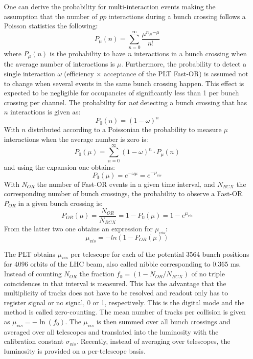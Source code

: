 One can derive the probability for multi-interaction events making the assumption that
the number of $pp$ interactions during a bunch crossing follows a Poisson statistics the following:
\begin{equation}
P_{\mu}(n) = \sum_{n=0}^{\infty} \frac{\mu^n e^{-\mu}}{n!}
\end{equation}
where $P_\mu(n)$ is the probability to have $n$ interactions in a bunch crossing when the average
number of interactions is $\mu$. Furthermore, the probability to detect a single interaction $\omega$
(efficiency $\times$ acceptance of the PLT Fast-OR) is assumed not to change when several events in the same
bunch crossing happen. This effect is expected to be negligible for occupancies of significantly less than 1 per
bunch crossing per channel. The probability for {\em not} detecting a bunch crossing
that has $n$ interactions is given as:
\begin{equation}
P_0(n) = (1 - \omega)^n
\end{equation}
With $n$ distributed according to a Poissonian the probability to measure $\mu$ interactions
when the average number is zero is:
\begin{equation}
P_0(\mu) = \sum_{n=0}^{\infty} (1 - \omega)^n \cdot P_{\mu}(n)
\end{equation}
and using the expansion one obtains:
\begin{equation}
P_0(\mu) = e^{-\omega \mu} = e^{-\mu_{vis}}
\end{equation}
With $N_{OR}$ the number of Fast-OR events in a given time interval, and $N_{BCX}$ the
corresponding number of bunch crossings, the probability to observe a Fast-OR $P_{OR}$
in a given bunch crossing is:
\begin{equation}
P_{OR}(\mu) = \frac{N_{OR}}{N_{BCX}} = 1 - P_0(\mu) = 1 - e^{\mu_{vis}}
\end{equation}
From the latter two one obtains an expression for $\mu_{vis}$:
\begin{equation}
\mu_{vis} = - ln(1 - P_{OR}(\mu))
\end{equation}


The PLT obtains $\mu_{vis}$ per telescope for each of the potential 3564 bunch positions
for 4096 orbits of the LHC beam, also called nibble corresponding to 0.365 ms.
Instead of counting $N_{OR}$ the fraction $f_0 = (1 - N_{OR}/N_{BCX})$ of no triple coincidences
in that interval is measured. This has the advantage that the multiplicity of tracks does not have
to be resolved and readout only has to register signal or no signal, 0 or 1, respectively.
This is the digital mode and the method is called zero-counting. The mean number of tracks per collision
is given as $\mu_{vis} = -\ln ( f_0 )$.
The $\mu_{vis}$ is then summed over all bunch crossings and averaged over all telescopes
and translated into the luminosity with the calibration constant $\sigma_{vis}$.
Recently, instead of averaging over telescopes, the luminosity is provided on a per-telescope basis.
